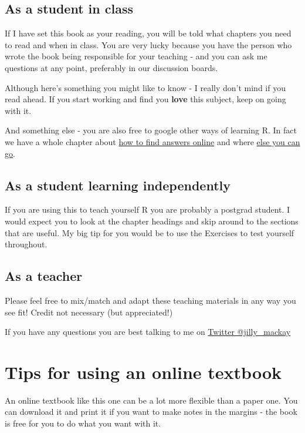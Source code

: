 \documentclass[
]{book}
\begin{document}
\hypertarget{useinclass}{%
\subsection{As a student in class}\label{useinclass}}

If I have set this book as your reading, you will be told what chapters you need to read and when in class. You are very lucky because you have the person who wrote the book being responsible for your teaching - and you can ask me questions at any point, preferably in our discussion boards.

Although here's something you might like to know - I really don't mind if you read ahead. If you start working and find you \textbf{love} this subject, keep on going with it.

And something else - you are also free to google other ways of learning R. In fact we have a whole chapter about \protect\hyperlink{trouble}{how to find answers online} and where \protect\hyperlink{whatnext}{else you can go}.

\hypertarget{useindependent}{%
\subsection{As a student learning independently}\label{useindependent}}

If you are using this to teach yourself R you are probably a postgrad student. I would expect you to look at the chapter headings and skip around to the sections that are useful. My big tip for you would be to use the Exercises to test yourself throughout.

\hypertarget{useteach}{%
\subsection{As a teacher}\label{useteach}}

Please feel free to mix/match and adapt these teaching materials in any way you see fit! Credit not necessary (but appreciated!)

If you have any questions you are best talking to me on \href{https://twitter.com/jilly_mackay}{Twitter @jilly\_mackay}

\hypertarget{usetips}{%
\section{Tips for using an online textbook}\label{usetips}}

An online textbook like this one can be a lot more flexible than a paper one. You can download it and print it if you want to make notes in the margins - the book is free for you to do what you want with it.
\end{document}
